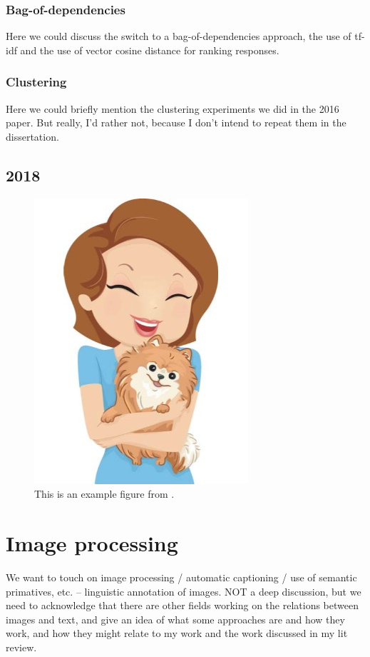 \subsubsection{Bag-of-dependencies}
Here we could discuss the switch to a bag-of-dependencies approach, the use of tf-idf and the use of vector cosine distance for ranking responses.

\subsubsection{Clustering}
Here we could briefly mention the clustering experiments we did in the 2016 paper. But really, I'd rather not, because I don't intend to repeat them in the dissertation.

\subsection{2018}
\cite{king:dickinson:18}

\begin{figure}
\includegraphics[width=.7\textwidth]{figures/I29.jpg}
\caption{This is an example figure from \citet{king:dickinson:18}.}
\label{figure:KandD2018}
\end{figure}

\section{Image processing}
\label{figure:imageProcessing}
We want to touch on image processing / automatic captioning / use of semantic primatives, etc. -- linguistic annotation of images. NOT a deep discussion, but we need to acknowledge that there are other fields working on the relations between images and text, and give an idea of what some approaches are and how they work, and how they might relate to my work and the work discussed in my lit review.


